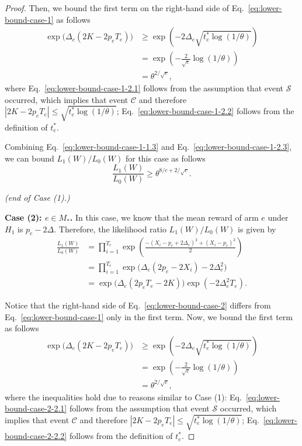 \documentclass{article}
\begin{document}
\begin{spacing}{1.1}
\begin{proof}
Then, we bound the first term on the right-hand side of Eq.~\eqref{eq:lower-bound-case-1} as follows
\begin{align}
	\exp\big(\Delta_e(2K-2p_eT_e)\big) & \ge \exp\left(-2\Delta_e\sqrt{t_e^*\log(1/\theta)}\right) \label{eq:lower-bound-case-1-2.1}\\
								       & = \exp\left(-\frac{2}{\sqrt{c}}\log(1/\theta)\right) \label{eq:lower-bound-case-1-2.2}\\
								       &=\theta^{2/\sqrt{c}},  \label{eq:lower-bound-case-1-2.3}
\end{align}
where Eq.~\eqref{eq:lower-bound-case-1-2.1} follows from the assumption that event $\mathcal S$ occurred, which implies that event $\mathcal C$ and therefore $|2K-2p_eT_e| \le \sqrt{t_e^*\log(1/\theta)}$; 
Eq.~\eqref{eq:lower-bound-case-1-2.2} follows from the definition of $t_e^*$.

Combining Eq.~\eqref{eq:lower-bound-case-1-1.3} and Eq.~\eqref{eq:lower-bound-case-1-2.3}, we can bound $L_1(W)/L_0(W)$ for this case as follows
\begin{equation}
\label{eq:ll-case1-final} 
\frac{L_1(W)}{L_0(W)} \ge \theta^{8/c+2/\sqrt{c}}. 
\end{equation}


\emph{(end of Case (1).)}

\textbf{Case (2): $e\in M_*$.}
In this case, we know that the mean reward of arm $e$ under $H_1$ is $p_e-2\Delta$.
Therefore, the likelihood ratio $L_1(W)/L_0(W)$ is given by
\begin{align}
  \frac{L_1(W)}{L_0(W)} &= \prod_{i=1}^{T_e} \exp\left(\frac{-(X_i-p_e+2\Delta_e)^2+(X_i-p_e)^2}{2}\right) \nonumber \\
  						&= \prod_{i=1}^{T_e} \exp\big(\Delta_e(2p_e-2X_i)-2\Delta_e^2\big) \nonumber \\
  						&= \exp\big(\Delta_e(2p_eT_e-2K)\big)\exp(-2\Delta_e^2T_e) \label{eq:lower-bound-case-2}.
\end{align}

Notice that the right-hand side of Eq.~\eqref{eq:lower-bound-case-2} differs from Eq.~\eqref{eq:lower-bound-case-1} only in the first term.
Now, we bound the first term as follows
\begin{align}
	\exp\big(\Delta_e(2K-2p_eT_e)\big) & \ge \exp\left(-2\Delta_e\sqrt{t_e^*\log(1/\theta)}\right) \label{eq:lower-bound-case-2-2.1}\\
								       & = \exp\left(-\frac{2}{\sqrt{c}}\log(1/\theta)\right) \label{eq:lower-bound-case-2-2.2}\\
								       &=\theta^{2/\sqrt{c}},  \label{eq:lower-bound-case-2-2.3}
\end{align}
where the inequalities hold due to reasons similar to Case (1): Eq.~\eqref{eq:lower-bound-case-2-2.1} follows from the assumption that event $\mathcal S$ occurred, which implies that event $\mathcal C$ and therefore $|2K-2p_eT_e| \le \sqrt{t_e^*\log(1/\theta)}$; 
Eq.~\eqref{eq:lower-bound-case-2-2.2} follows from the definition of $t_e^*$.


\end{proof}
\end{spacing}
\end{document}
